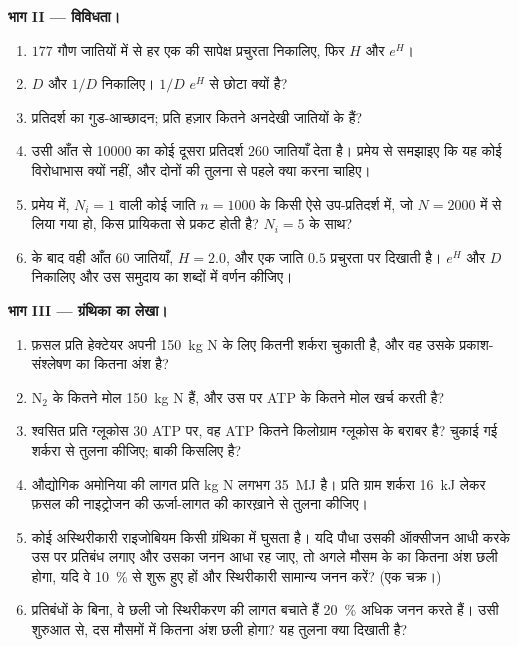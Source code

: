 \begin{problem}
\medskip
\noindent\textbf{भाग II --- विविधता।}
\begin{enumerate}[resume]
  \item $177$ गौण जातियों में से हर एक की सापेक्ष प्रचुरता निकालिए,
        फिर  $H$ और $e^{H}$।
  \item {} $D$ और $1/D$ निकालिए। $1/D$ $e^{H}$ से छोटा
        क्यों है?
  \item प्रतिदर्श का गुड-आच्छादन; प्रति हज़ार कितने  अनदेखी जातियों
        के हैं?
  \item उसी आँत से \num{10000}  का कोई दूसरा प्रतिदर्श $260$
        जातियाँ देता है।  प्रमेय से समझाइए कि यह कोई विरोधाभास
        क्यों नहीं, और दोनों की तुलना से पहले क्या करना चाहिए।
  \item प्रमेय में, $N_{i} = 1$ वाली कोई जाति $n = 1000$ के किसी ऐसे
        उप-प्रतिदर्श में, जो $N =
        2000$ में से लिया गया हो, किस प्रायिकता से प्रकट होती है?
        $N_{i} = 5$ के साथ?
  \item {} के बाद वही आँत $60$ जातियाँ, $H = 2.0$, और एक
        जाति $0.5$ प्रचुरता पर दिखाती है। $e^{H}$ और $D$ निकालिए और उस
        समुदाय का शब्दों में वर्णन कीजिए।
\end{enumerate}

\medskip
\noindent\textbf{भाग III --- ग्रंथिका का लेखा।}
\begin{enumerate}[resume]
  \item फ़सल प्रति हेक्टेयर अपनी \qty{150}{kg} N के लिए कितनी शर्करा
        चुकाती है, और वह उसके प्रकाश-संश्लेषण का कितना अंश है?
  \item N$_{2}$ के कितने मोल \qty{150}{kg} N हैं, और  उस
        पर ATP के कितने मोल खर्च करती है?
  \item श्वसित प्रति ग्लूकोस $30$ ATP पर, वह ATP कितने किलोग्राम
        ग्लूकोस के बराबर है? चुकाई गई शर्करा से तुलना कीजिए; बाकी
        किसलिए है?
  \item औद्योगिक अमोनिया की लागत प्रति kg N लगभग \qty{35}{MJ} है।
        प्रति ग्राम शर्करा \qty{16}{kJ} लेकर फ़सल की नाइट्रोजन की
        ऊर्जा-लागत की कारख़ाने से तुलना कीजिए।
  \item कोई अस्थिरीकारी राइजोबियम किसी ग्रंथिका में घुसता है। यदि पौधा
        उसकी ऑक्सीजन आधी करके उस पर प्रतिबंध लगाए और उसका जनन आधा रह
        जाए, तो अगले मौसम के  का कितना अंश छली होगा, यदि वे
        \qty{10}{\%} से शुरू हुए हों और स्थिरीकारी सामान्य जनन करें?
        (एक चक्र।)
  \item प्रतिबंधों के बिना, वे छली जो स्थिरीकरण की लागत बचाते हैं
        \qty{20}{\%} अधिक जनन करते हैं। उसी शुरुआत से, दस मौसमों में
        कितना अंश छली होगा? यह तुलना क्या दिखाती है?
\end{enumerate}


\end{problem}
